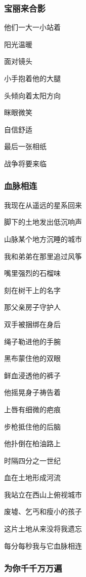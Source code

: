 \documentclass[openany,scheme = chinese, linespread = 1.5]{ctexbook}
\begin{document}
\subsubsection*{宝丽来合影}

\begin{center}
他们一大一小站着

阳光温暖

面对镜头

小手抱着他的大腿

头倾向着太阳方向

眯眼微笑

自信舒适

最后一张相纸

战争将要来临
\end{center}

\subsubsection*{血脉相连}
\begin{center}
我现在从遥远的星系回来

脚下的土地发出低沉响声

山脉某个地方沉睡的城市

我和弟弟在那里追过风筝

嘴里强烈的石榴味

刻在树干上的名字

那父亲房子守护人

双手被捆绑在身后

绳子勒进他的手腕

黑布蒙住他的双眼

鲜血浸透他的裤子

他摇晃身子祷告着

上唇有细微的疤痕

步枪抵住他的后脑

他扑倒在柏油路上

时隔四分之一世纪

血在土地形成河流

我站立在西山上俯视城市

废墟、乞丐和瘦小的孩子

这片土地从来没将我遗忘

每分每秒我与它血脉相连
\end{center}

\subsubsection*{为你千千万万遍}
\end{document}
